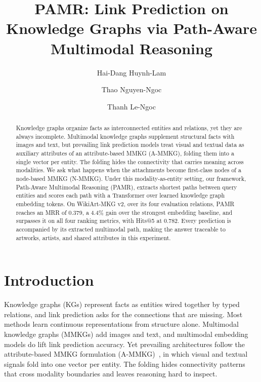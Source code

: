 \documentclass[runningheads]{llncs}
\begin{document}
%
\title{PAMR: Link Prediction on Knowledge Graphs via Path-Aware Multimodal Reasoning}
%

\author{Hai-Dang Huynh-Lam \and
  Thao Nguyen-Ngoc \and
Thanh Le-Ngoc}
%
%
\maketitle  %
%
\begin{abstract}
  Knowledge graphs organize facts as interconnected entities and relations, yet
  they are always incomplete. Multimodal knowledge graphs supplement structural
  facts with images and text, but prevailing link prediction models treat visual
  and textual data as auxiliary attributes of an attribute-based MMKG (A-MMKG),
  folding them into a single vector per entity. The folding hides the
  connectivity that carries meaning across modalities. We ask what happens when
  the attachments become first-class nodes of a node-based MMKG (N-MMKG). Under
  this modality-as-entity setting, our framework, Path-Aware Multimodal
  Reasoning (PAMR), extracts shortest paths between query entities and scores
  each path with a Transformer over learned knowledge graph embedding
  tokens. On WikiArt-MKG v2,
  over its four evaluation relations, PAMR
  reaches an MRR of 0.379, a 4.4\% gain over the strongest embedding
  baseline, and surpasses it on all four ranking metrics, with Hits@5 at 0.782. Every prediction is accompanied by its extracted multimodal path,
  making the answer traceable to artworks, artists, and shared
  attributes in this experiment.

\end{abstract}
%
%
%

\section{Introduction}
\label{sec:introduction}

Knowledge graphs (KGs) represent facts as entities wired together by typed relations, and link prediction asks for the connections that are missing. Most methods learn continuous representations from structure alone. Multimodal knowledge graphs (MMKGs) add images and text, and multimodal embedding models do lift link prediction accuracy. Yet prevailing architectures follow the attribute-based MMKG formulation (A-MMKG)~\cite{zhu2024multimodal}, in which visual and textual signals fold into one vector per entity. The folding hides connectivity patterns that cross modality boundaries and leaves reasoning hard to inspect.
\end{document}
